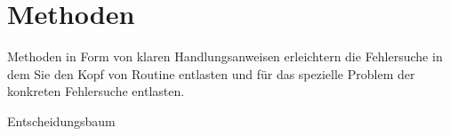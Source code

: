 \chapter{Methoden}
\label{cha:methoden}

\begin{abstractsec}
  Methoden in Form von klaren Handlungsanweisen erleichtern die Fehlersuche in
  dem Sie den Kopf von Routine entlasten und für das spezielle Problem der
  konkreten Fehlersuche entlasten.
\end{abstractsec}

\begin{notes}
\item Entscheidungsbaum
\end{notes}










